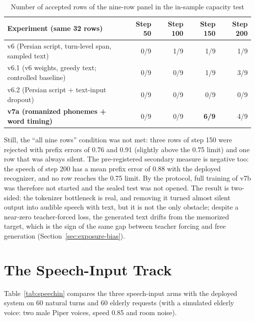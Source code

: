 \begin{table}[ht]
\centering
\caption{Number of accepted rows of the nine-row panel in the in-sample capacity test}
\label{tab:moshi-v7}
\small
\begin{tabular}{lrrrr}
\toprule
Experiment (same 32 rows) & Step 50 & Step 100 & Step 150 & Step 200 \\
\midrule
v6 (Persian script, turn-level span, sampled text) & 0/9 & 1/9 & 1/9 & 1/9 \\
v6.1 (v6 weights, greedy text; controlled baseline) & 0/9 & 0/9 & 1/9 & 3/9 \\
v6.2 (Persian script + text-input dropout) & 0/9 & 0/9 & 0/9 & 0/9 \\
\textbf{v7a (romanized phonemes + word timing)} & 0/9 & 0/9 & \textbf{6/9} & 4/9 \\
\bottomrule
\end{tabular}
\end{table}

Still, the ``all nine rows'' condition was not met: three rows of step 150 were rejected with
prefix errors of 0.76 and 0.91 (slightly above the 0.75 limit) and one row that was always
silent. The pre-registered secondary measure is negative too: the speech of step 200 has a
mean prefix error of 0.88 with the deployed recognizer, and no row reaches the 0.75 limit. By
the protocol, full training of v7b was therefore not started and the sealed test was not
opened. The result is two-sided: the tokenizer bottleneck is real, and removing it turned
almost silent output into audible speech with text, but it is not the only obstacle; despite a
near-zero teacher-forced loss, the generated text drifts from the memorized target, which is
the sign of the same gap between teacher forcing and free generation
(Section~\ref{sec:exposure-bias}).

\section{The Speech-Input Track}
\label{sec:res-speechin}

Table~\ref{tab:speechin} compares the three speech-input arms with the deployed system on 60
natural turns and 60 elderly requests (with a simulated elderly voice: two male Piper voices,
speed 0.85 and room noise).


